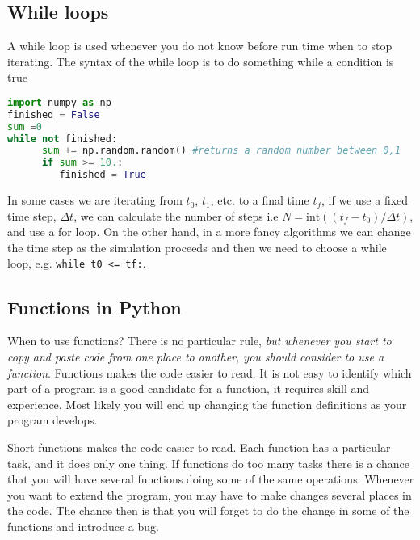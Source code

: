 \documentclass[graybox,sectrefs,envcountresetchap,open=right,final]{svmonodo}
\newenvironment{graybox2admon}[1][]{
\begin{graybox2mdframed}[frametitle=#1]
}
{
\end{graybox2mdframed}
}
\begin{document}
\subsection{While loops}
A while loop is used whenever you do not know before run time when to stop iterating. The syntax of the while loop is to do something while a condition is true








\begin{lstlisting}[language=python,style=blue1bar]
import numpy as np
finished = False
sum =0
while not finished:
      sum += np.random.random() #returns a random number between 0,1
      if sum >= 10.:
      	 finished = True

\end{lstlisting}

In some cases we are iterating from $t_0$, $t_1$, etc. to a final time $t_f$, if we use a fixed time step, $\Delta t$, we can calculate the number of steps i.e $N= \text{int} ((t_f-t_0)/\Delta t)$, and use a for loop. On the other hand, in a more fancy algorithms we can change the time step as the simulation proceeds and then we need to choose a while loop, e.g. \texttt{while t0 <= tf:}. 
\subsection{Functions in Python}
When to use functions? There is no particular rule, \emph{but whenever you
start to copy and paste code from one place to another, you should
consider to use a function}. Functions makes the code easier to read.
It is not easy to identify which part of a program is a good candidate
for a function, it requires skill and experience. Most likely you will
end up changing the function definitions as your program develops.



\begin{graybox2admon}[Use short functions]
Short functions makes the code easier to read. Each function has a particular task, and it does only one thing. If functions do too many tasks there is a chance that you will have several functions doing some of the same operations. Whenever you want to extend the program, you may have to make changes several places in the code. The chance then is that you will forget to do the change in some of the functions and introduce a bug.
\end{graybox2admon}
\end{document}
